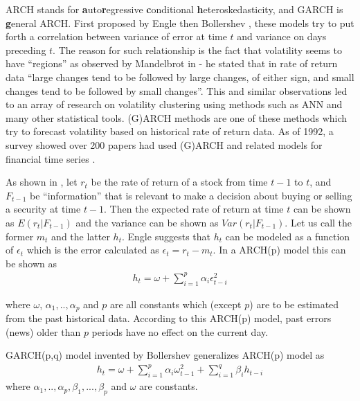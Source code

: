 ARCH stands for \textbf{a}uto\textbf{r}egressive \textbf{c}onditional
\textbf{h}eteroskedasticity, and GARCH is \textbf{g}eneral ARCH. First proposed
by Engle \cite{engle3} then Bollershev \cite{bollershev}, these models try to
put forth a correlation between variance of error at time $t$ and variance on
days preceding $t$. The reason for such relationship is the fact that volatility
seems to have ``regions'' as observed by Mandelbrot in \cite{mandelbrot} - he
stated that in rate of return data ``large changes tend to be followed by large
changes, of either sign, and small changes tend to be followed by small
changes''. This and similar observations led to an array of research on
volatility clustering using methods such as ANN and many other statistical
tools. (G)ARCH methods are one of these methods which try to forecast volatility
based on historical rate of return data. As of 1992, a survey showed over 200
papers had used (G)ARCH and related models for financial time series
\cite{engle2}.

As shown in \cite{engle2}, let $r_t$ be the rate of return of a stock from time
$t-1$ to $t$, and $F_{t-1}$ be ``information'' that is relevant to make a
decision about buying or selling a security at time $t-1$. Then the expected
rate of return at time $t$ can be shown as $E(r_t|F_{t-1})$ and the variance can
be shown as $Var(r_t|F_{t-1})$. Let us call the former $m_t$ and the latter
$h_t$. Engle \cite{engle3} suggests that $h_t$ can be modeled as a function of
$\epsilon_t$ which is the error calculated as $\epsilon_t = r_t - m_t$. In a
ARCH(p) model this can be shown as 
\begin{eqnarray*}
h_t = \omega + \sum_{i=1}^p \alpha_i\epsilon_{t-i}^2
\end{eqnarray*}

where $\omega$, $\alpha_1,..,\alpha_p$ and $p$ are all constants which (except
$p$) are to be estimated from the past historical data. According to this
ARCH(p) model, past errors (news) older than $p$ periods have no effect on the
current day.

GARCH(p,q) model invented by Bollershev \cite{bollershev} generalizes ARCH(p)
model as
\begin{eqnarray*}
h_t = \omega + \sum_{i=1}^p \alpha_i \omega_{t-1}^2 + \sum_{i=1}^q \beta_i h_{t-i}
\end{eqnarray*}
where $\alpha_1,..,\alpha_p,\beta_1,...,\beta_p$ and $\omega$ are constants. 

